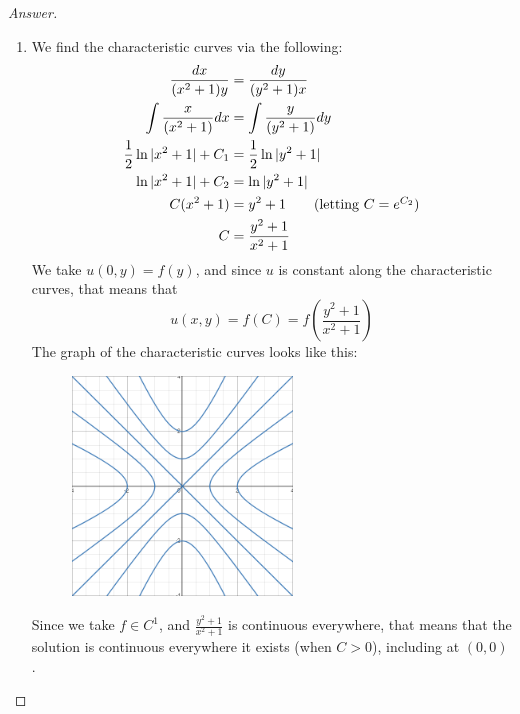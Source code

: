 \documentclass{article}
\theoremstyle{definition}
\renewcommand\qedsymbol{$\blacksquare$}
\newenvironment{ans}{\begin{proof}[Answer]\renewcommand{\qedsymbol}{}}{\end{proof}}
\begin{document}
	\begin{ans}
		\begin{enumerate}[resume*=answers]
			\item We find the characteristic curves via the following:
            \begin{align*}
                \frac{dx}{(x^2+1)y} &= \frac{dy}{(y^2+1)x}\\
                \int \frac{x}{(x^2+1)}dx &= \int\frac{y}{(y^2+1)}dy\\
                \frac{1}{2}\ln|x^2+1| + C_1 &= \frac{1}{2}\ln|y^2+1|\\
                \ln|x^2+1| + C_2 &= \ln|y^2+1|\\
                C(x^2+1) &= y^2+1 \tag{letting $C = e^{C_2}$}\\
                C &= \frac{y^2+1}{x^2+1}
            \end{align*}
            We take $u(0,y) = f(y)$, and since $u$ is constant along the characteristic curves, that means that
            \[\boxed{u(x,y) = f(C) = f\left(\frac{y^2+1}{x^2+1}\right)}\]
            The graph of the characteristic curves looks like this:
            \begin{figure}[H]
                \centering
                \includegraphics[width=2.3in]{18 graph.png}
            \end{figure}
            Since we take $f\in C^1$, and $\frac{y^2+1}{x^2+1}$ is continuous everywhere, that means that the solution is continuous everywhere it exists (when $C > 0$), including at $(0,0)$.
            

\end{enumerate}
\end{ans}
\end{document}
